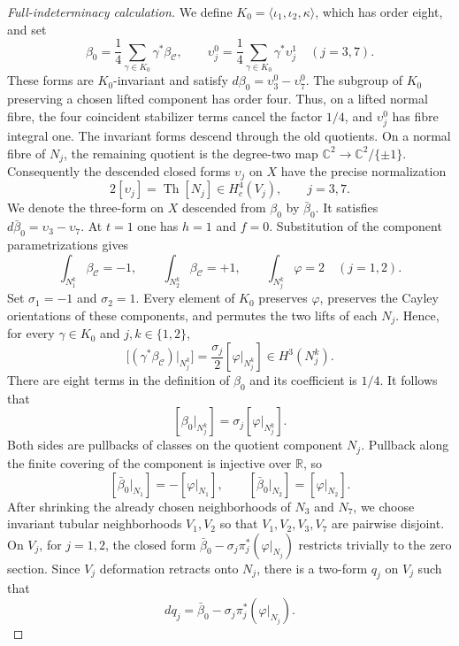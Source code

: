 \documentclass[11pt]{article}
\theoremstyle{remark}\newtheorem{remark}[theorem]{Remark}
\newcommand{\R}{\mathbb R}
\newcommand{\C}{\mathbb C}
\begin{document}
\begin{proof}[Full-indeterminacy calculation]
We define $K_0=\langle\iota_1,\iota_2,\kappa\rangle$, which has order
eight, and set
\[
 \beta_0=\frac14\sum_{\gamma\in K_0}\gamma^*\beta_{\mathcal C},
 \qquad
 \upsilon_j^0=\frac14\sum_{\gamma\in K_0}\gamma^*\upsilon_j^1
 \quad(j=3,7).
\]
These forms are $K_0$-invariant and satisfy
$d\beta_0=\upsilon_3^0-\upsilon_7^0$.  The subgroup of $K_0$ preserving a
chosen lifted component has order four.  Thus, on a lifted normal fibre,
the four coincident stabilizer terms cancel the factor $1/4$, and
$\upsilon_j^0$ has fibre integral one.  The invariant forms descend
through the old quotients.  On a normal fibre of $N_j$, the remaining
quotient is the degree-two map
$\C^2\to\C^2/\{\pm1\}$.  Consequently the descended closed forms
$\upsilon_j$ on $X$ have the precise normalization
\begin{equation}\label{eq:half-Thom}
 2[\upsilon_j]=\operatorname{Th}[N_j]\in H_c^4(V_j),
 \qquad j=3,7.
\end{equation}
We denote the three-form on $X$ descended from $\beta_0$ by
$\bar\beta_0$.  It satisfies
$d\bar\beta_0=\upsilon_3-\upsilon_7$.
At $t=1$ one has $h=1$ and $f=0$.  Substitution of the component
parametrizations gives
\[
 \int_{N_1^k}\beta_{\mathcal C}=-1,\qquad
 \int_{N_2^k}\beta_{\mathcal C}=+1,\qquad
 \int_{N_j^k}\varphi=2\quad(j=1,2).
\]
Set $\sigma_1=-1$ and $\sigma_2=1$.  Every element of $K_0$ preserves
$\varphi$, preserves the Cayley orientations of these components, and
permutes the two lifts of each $N_j$.  Hence, for every
$\gamma\in K_0$ and $j,k\in\{1,2\}$,
\[
 \bigl[(\gamma^*\beta_{\mathcal C})|_{N_j^k}\bigr]
 =\frac{\sigma_j}{2}[\varphi|_{N_j^k}]\in H^3(N_j^k).
\]
There are eight terms in the definition of $\beta_0$ and its coefficient
is $1/4$.  It follows that
\[
 [\beta_0|_{N_j^k}]=\sigma_j[\varphi|_{N_j^k}].
\]
Both sides are pullbacks of classes on the quotient component $N_j$.
Pullback along the finite covering of the component is injective over
$\R$, so
\begin{equation}\label{eq:beta0-restrictions}
 [\bar\beta_0|_{N_1}]=-[\varphi|_{N_1}],\qquad
 [\bar\beta_0|_{N_2}]= [\varphi|_{N_2}].
\end{equation}
After shrinking the already chosen neighborhoods of $N_3$ and $N_7$, we
choose invariant tubular neighborhoods $V_1,V_2$ so that
$V_1,V_2,V_3,V_7$ are pairwise disjoint.  On $V_j$, for $j=1,2$, the
closed form
$\bar\beta_0-\sigma_j\pi_j^*(\varphi|_{N_j})$ restricts trivially to the
zero section.  Since $V_j$ deformation retracts onto $N_j$, there is a
two-form $q_j$ on $V_j$ such that
\[
 dq_j=\bar\beta_0-\sigma_j\pi_j^*(\varphi|_{N_j}).
\]
\end{proof}
\end{document}
